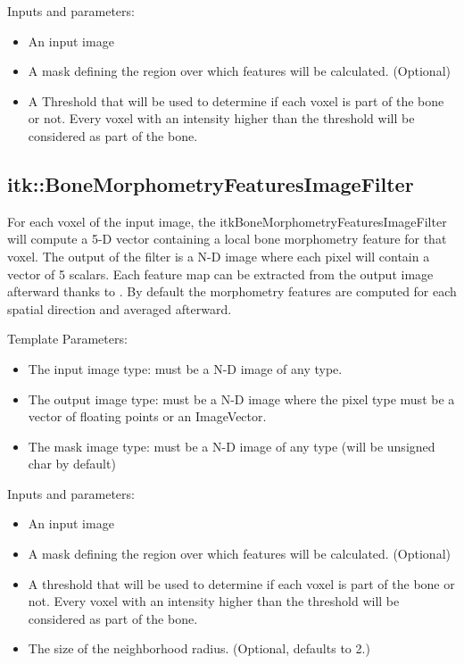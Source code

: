 \documentclass{InsightArticle}
\begin{document}
Inputs and parameters:
\begin{itemize}
 \item An input image
 \item A mask defining the region over which features will be calculated. (Optional)
 \item A Threshold that will be used to determine if each voxel is part of the bone or not. Every voxel with an intensity higher than the threshold will be considered as part of the bone. 
\end{itemize}

\subsection{itk::BoneMorphometryFeaturesImageFilter}
\label{sec:BMImageFilter}

For each voxel of the input image, the itkBoneMorphometryFeaturesImageFilter will compute a 5-D vector containing a local bone morphometry feature for that voxel. The output of the filter is a N-D image where each pixel will contain a vector of 5 scalars. Each feature map can be extracted from the output image afterward thanks to . By default the morphometry features are computed for each spatial direction and averaged afterward.

Template Parameters:
\begin{itemize}
 \item The input image type: must be a N-D image of any type.
 \item The output image type: must be a N-D image where the pixel type must be a vector of floating points or an ImageVector.
 \item The mask image type: must be a N-D image of any type (will be unsigned char by default)
\end{itemize}

Inputs and parameters:
\begin{itemize}
 \item An input image
 \item A mask defining the region over which features will be calculated. (Optional)
 \item A threshold that will be used to determine if each voxel is part of the bone or not. Every voxel with an intensity higher than the threshold will be considered as part of the bone. 
 \item The size of the neighborhood radius. (Optional, defaults to 2.)
\end{itemize}
\end{document}
